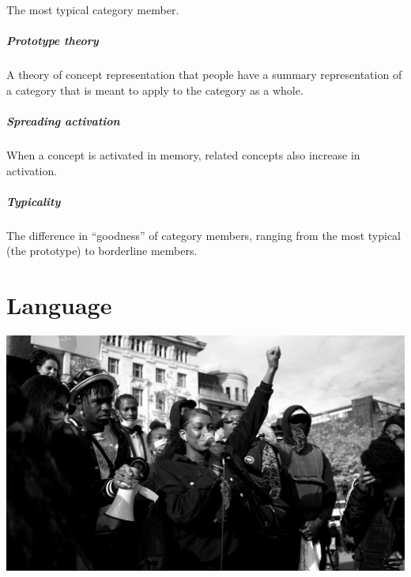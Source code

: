 \documentclass[
]{krantz}
\begin{document}
The most typical category member.

\hypertarget{prototype-theory}{%
\paragraph*{Prototype theory}\label{prototype-theory}}

A theory of concept representation that people have a summary representation of a category that is meant to apply to the category as a whole.

\hypertarget{spreading-activation}{%
\paragraph*{Spreading activation}\label{spreading-activation}}

When a concept is activated in memory, related concepts also increase in activation.

\hypertarget{typicality-1}{%
\paragraph*{Typicality}\label{typicality-1}}

The difference in ``goodness'' of category members, ranging from the most typical (the prototype) to borderline members.

\hypertarget{language}{%
\chapter{Language}\label{language}}

\begin{center}\includegraphics[width=1\linewidth]{images/ch8/cover} \end{center}
\end{document}
